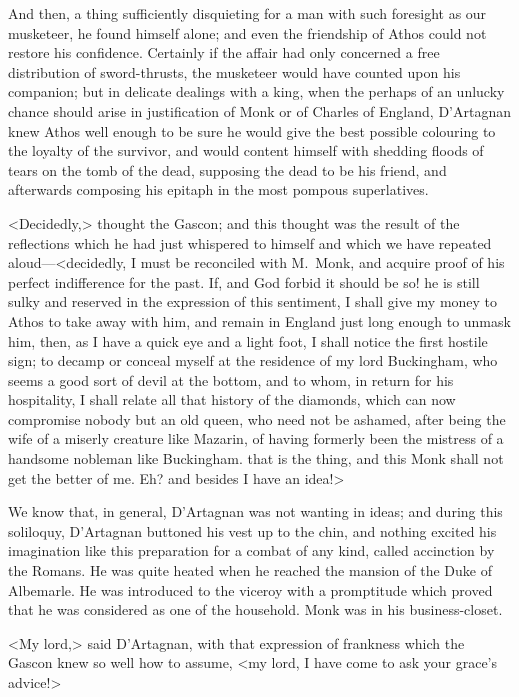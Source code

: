And then, a thing sufficiently disquieting for a man with such foresight as our musketeer, he found himself alone; and even the friendship of Athos could not restore his confidence. Certainly if the affair had only concerned a free distribution of sword-thrusts, the musketeer would have counted upon his companion; but in delicate dealings with a king, when the perhaps of an unlucky chance should arise in justification of Monk or of Charles of England, D'Artagnan knew Athos well enough to be sure he would give the best possible colouring to the loyalty of the survivor, and would content himself with shedding floods of tears on the tomb of the dead, supposing the dead to be his friend, and afterwards composing his epitaph in the most pompous superlatives.

<Decidedly,> thought the Gascon; and this thought was the result of the reflections which he had just whispered to himself and which we have repeated aloud—<decidedly, I must be reconciled with M.~Monk, and acquire proof of his perfect indifference for the past. If, and God forbid it should be so! he is still sulky and reserved in the expression of this sentiment, I shall give my money to Athos to take away with him, and remain in England just long enough to unmask him, then, as I have a quick eye and a light foot, I shall notice the first hostile sign; to decamp or conceal myself at the residence of my lord Buckingham, who seems a good sort of devil at the bottom, and to whom, in return for his hospitality, I shall relate all that history of the diamonds, which can now compromise nobody but an old queen, who need not be ashamed, after being the wife of a miserly creature like Mazarin, of having formerly been the mistress of a handsome nobleman like Buckingham.  that is the thing, and this Monk shall not get the better of me. Eh? and besides I have an idea!>

We know that, in general, D'Artagnan was not wanting in ideas; and during this soliloquy, D'Artagnan buttoned his vest up to the chin, and nothing excited his imagination like this preparation for a combat of any kind, called accinction by the Romans. He was quite heated when he reached the mansion of the Duke of Albemarle. He was introduced to the viceroy with a promptitude which proved that he was considered as one of the household. Monk was in his business-closet.

<My lord,> said D'Artagnan, with that expression of frankness which the Gascon knew so well how to assume, <my lord, I have come to ask your grace's advice!>

